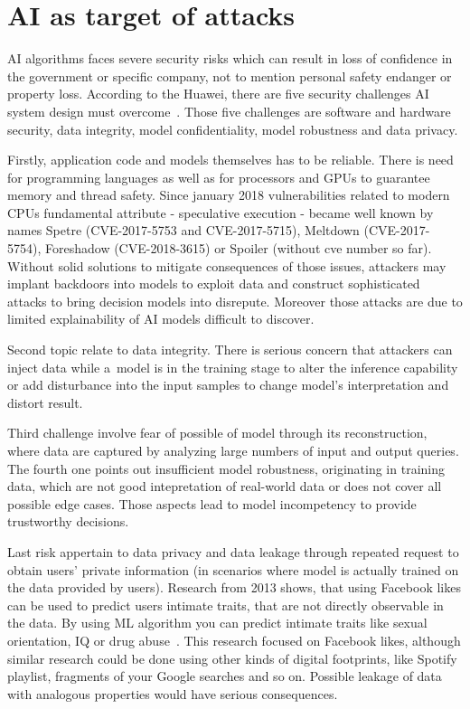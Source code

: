 \section{AI as target of attacks}\label{sec:ai-as-target-of-attacks}

AI algorithms faces severe security risks which can result in loss of confidence in the government or specific company, not to mention personal safety endanger or property loss.
According to the Huawei, there are five security challenges AI system design must overcome~\cite{huawei_security}.
Those five challenges are software and hardware security, data integrity, model confidentiality, model robustness and data privacy.

Firstly, application code and models themselves has to be reliable.
There is need for programming languages as well as for processors and GPUs to guarantee memory and thread safety.
Since january 2018 vulnerabilities related to modern CPUs fundamental attribute - speculative execution - became well known by names Spetre (CVE-2017-5753 and CVE-2017-5715), Meltdown (CVE-2017-5754), Foreshadow (CVE-2018-3615) or Spoiler (without \acrshort{cve} number so far).
Without solid solutions to mitigate consequences of those issues, attackers may implant backdoors into models to exploit data and construct sophisticated attacks to bring decision models into disrepute.
Moreover those attacks are due to limited explainability of AI models difficult to discover.

Second topic relate to data integrity.
There is serious concern that attackers can inject data while a~model is in the training stage to alter the inference capability or add disturbance into the input samples to change model's interpretation and distort result.

Third challenge involve fear of possible  of model through its reconstruction, where data are captured by analyzing large numbers of input and output queries.
The fourth one points out insufficient model robustness, originating in training data, which are not good intepretation of real-world data or does not cover all possible edge cases.
Those aspects lead to model incompetency to provide trustworthy decisions.

Last risk appertain to data privacy and data leakage through repeated request to obtain users’ private information (in scenarios where model is actually trained on the data provided by users).
Research from 2013 shows, that using Facebook likes can be used to predict users intimate traits, that are not directly observable in the data.
By using ML algorithm you can predict intimate traits like sexual orientation, IQ or drug abuse~\cite{Kosinski5802}.
This research focused on Facebook likes, although similar research could be done using other kinds of digital footprints, like Spotify playlist, fragments of your Google searches and so on.
Possible leakage of data with analogous properties would have serious consequences.

